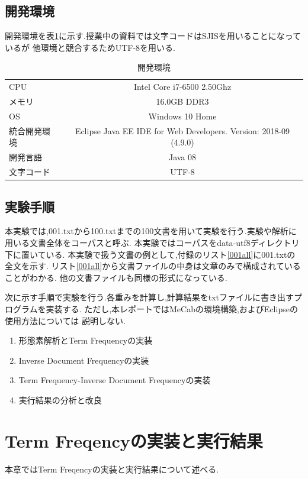 \documentclass[a4j]{jarticle}
\begin{document}
\subsection{開発環境}
開発環境を表\ref{kankyou}に示す.授業中の資料では文字コードはSJISを用いることになっているが
他環境と競合するためUTF-8を用いる.
\begin{table}[H]
  \caption{開発環境}
  \label{kankyou}
  \begin{center}
      \begin{tabular}{l|c}\hline
        CPU & Intel Core i7-6500 2.50Ghz \\ 
        メモリ & 16.0GB DDR3 \\
        OS & Windows 10 Home \\
        統合開発環境 & Eclipse Java EE IDE for Web Developers. Version: 2018-09 (4.9.0)\\
        開発言語 & Java 08 \\
        文字コード & UTF-8 \\ \hline
      \end{tabular}
  \end{center}
  \end{table}

\subsection{実験手順}
本実験では,001.txtから100.txtまでの100文書を用いて実験を行う.実験や解析に用いる文書全体をコーパスと呼ぶ.
本実験ではコーパスをdata-utf8ディレクトリ下に置いている.
本実験で扱う文書の例として,付録のリスト\ref{001all}に001.txtの全文を示す.
リスト\ref{001all}から文書ファイルの中身は文章のみで構成されていることがわかる.
他の文書ファイルも同様の形式になっている.
	
次に示す手順で実験を行う.各重みを計算し,計算結果をtxtファイルに書き出すプログラムを実装する.
ただし,本レポートではMeCabの環境構築,およびEclipseの使用方法については
説明しない.
\begin{enumerate}
  \item 形態素解析とTerm Frequencyの実装
  \item Inverse Document Frequencyの実装
  \item Term Frequency-Inverse Document Frequencyの実装
  \item 実行結果の分析と改良
\end{enumerate}

\section{Term Freqencyの実装と実行結果}
本章ではTerm Freqencyの実装と実行結果について述べる.
\end{document}
